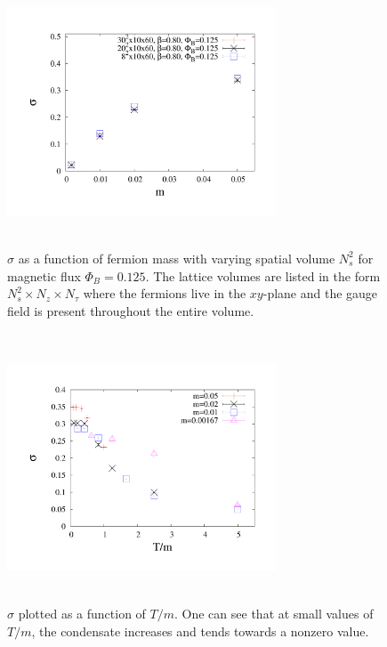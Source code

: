 \documentclass[aps,prd,twocolumn,showpacs,superscriptaddress,groupedaddress]{revtex4}  %
\begin{document}
\begin{figure}
\includegraphics[height=8cm,width=8cm]{pbp_vs_m_PHI0125_volcompare_3_graphene_paper.pdf} \hspace{-1cm}
\caption{$\sigma$ as a function of fermion mass with varying spatial volume $N^2_s$ for magnetic flux $\Phi_B=0.125$. The lattice volumes are listed in the form $N_s^2\times N_z \times N_{\tau}$ where the fermions live in the $xy$-plane and the gauge field is present throughout the entire volume.}
\label{PBPVolume}
\end{figure}

\begin{figure}
 \includegraphics[height=8cm,width=8cm]{pbp_vs_TdivM_PHI0125_zoom_graphene_paper.pdf} \hspace{-1cm}
\caption{$\sigma$ plotted as a function of $T/m$. One can see that at small values of $T/m$, the condensate increases and tends towards a nonzero value.}
\label{PBPvsTdivM}
\end{figure}
\end{document}
